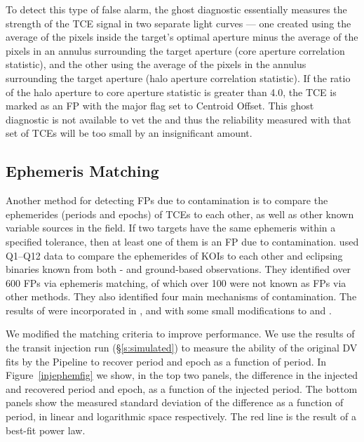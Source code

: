 To detect this type of false alarm, the ghost diagnostic essentially measures the strength of the TCE signal in two separate light curves --- one created using the average of the pixels inside the target's optimal aperture minus the average of the pixels in an annulus surrounding the target aperture (core aperture correlation statistic), and the other using the average of the pixels in the annulus surrounding the target aperture (halo aperture correlation statistic). If the ratio of the halo aperture to core aperture statistic is greater than 4.0, the TCE is marked as an FP with the major flag set to Centroid Offset. This ghost diagnostic is not available to vet the  and thus the reliability measured with that set of TCEs will be too small by an insignificant amount.



\subsection{Ephemeris Matching}
\label{ephemmatchsec}
\label{s:ephemmatch}

Another method for detecting FPs due to contamination is to compare the ephemerides (periods and epochs) of TCEs to each other, as well as other known variable sources in the \kepler{} field. If two targets have the same ephemeris within a specified tolerance, then at least one of them is an FP due to contamination. \citet{Coughlin2014a} used Q1--Q12 data to compare the ephemerides of KOIs to each other and eclipsing binaries known from both \kepler{}- and ground-based observations. They identified over 600 FPs via ephemeris matching, of which over 100 were not known as FPs via other methods. They also identified four main mechanisms of contamination. The results of \citet{Coughlin2014a} were incorporated in \citet[][see \S3.3]{Rowe2015a}, and with some small modifications to \citet[][see \S5.3]{Mullally2015cat} and \citet{Coughlin2016}.

We modified the matching criteria to improve performance. We use the results of the transit injection run (\S\ref{s:simulated}) to measure the ability of the original DV fits by the \kepler{} Pipeline to recover period and epoch as a function of period. In Figure~\ref{injephemfig} we show, in the top two panels, the difference in the injected and recovered period and epoch, as a function of the injected period. The bottom panels show the measured standard deviation of the difference as a function of period, in linear and logarithmic space respectively. The red line is the result of a best-fit power law.

